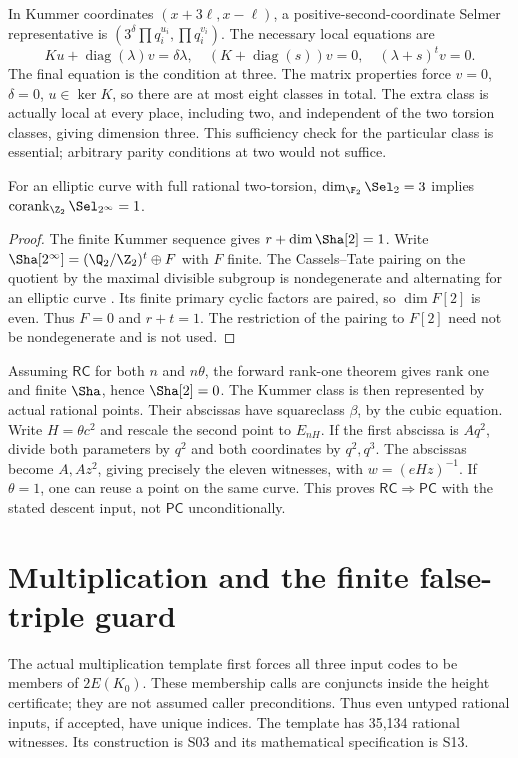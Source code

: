 In Kummer coordinates $(x+3\ell,x-\ell)$, a positive-second-coordinate
Selmer representative is $(3^\delta\prod q_i^{u_i},\prod q_i^{v_i})$.
The necessary local equations are
\[
 Ku+\operatorname{diag}(\lambda)v=\delta\lambda,\quad
 (K+\operatorname{diag}(s))v=0,\quad(\lambda+s)^tv=0.
\]
The final equation is the condition at three. The matrix properties
force $v=0$, $\delta=0$, $u\in\ker K$, so there are at most eight
classes in total. The extra class is actually local at every place,
including two, and independent of the two torsion classes, giving
dimension three. This sufficiency check for the particular class is
essential; arbitrary parity conditions at two would not suffice.

\begin{lemma}\label{lem:corank}
For an elliptic curve with full rational two-torsion,
$\dim_{\F_2}\Sel_2=3$ implies $\operatorname{corank}_{\Z_2}\Sel_{2^\infty}=1$.
\end{lemma}
\begin{proof}
The finite Kummer sequence gives $r+\dim\Sha[2]=1$.
Write $\Sha[2^\infty]=(\Q_2/\Z_2)^t\oplus F$ with $F$ finite.
The Cassels--Tate pairing on the quotient by the maximal divisible
subgroup is nondegenerate and alternating for an elliptic curve
\cite{poonenstoll}. Its finite primary cyclic factors are paired,
so $\dim F[2]$ is even. Thus $F=0$ and $r+t=1$. The restriction of
the pairing to $F[2]$ need not be nondegenerate and is not used.
\end{proof}

Assuming $\mathsf{RC}$ for both $n$ and $n\theta$, the forward rank-one
theorem \cite{gz,kolyvagin} gives rank one and finite $\Sha$, hence
$\Sha[2]=0$.
The Kummer class is then represented by actual rational points. Their
abscissas have squareclass $\beta$, by the cubic equation. Write
$H=\theta c^2$ and rescale the second point to $E_{nH}$. If the first
abscissa is $Aq^2$, divide both parameters by $q^2$ and both coordinates
by $q^2,q^3$. The abscissas become $A,Az^2$, giving precisely the
eleven witnesses, with $w=(eHz)^{-1}$. If $\theta=1$, one can reuse
a point on the same curve. This proves $\mathsf{RC}\Rightarrow\mathsf{PC}$
with the stated descent input, not $\mathsf{PC}$ unconditionally.

\section{Multiplication and the finite false-triple guard}\label{sec:mult}
The actual multiplication template first forces all three input codes
to be members of $2E(K_0)$. These membership calls are conjuncts inside
the height certificate; they are not assumed caller preconditions.
Thus even untyped rational inputs, if accepted, have unique indices.
The template has 35,134 rational witnesses. Its construction is S03
and its mathematical specification is S13.

